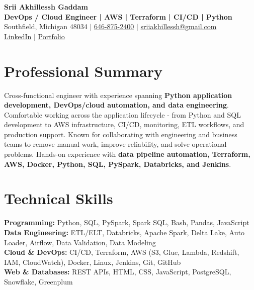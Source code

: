 \documentclass[letterpaper,10pt]{article}
\begin{document}
\fontsize{9.35pt}{10.45pt}\selectfont

\begin{center}
    {\LARGE \textbf{Srii Akhillessh Gaddam}} \\[-1pt]
    \textbf{DevOps / Cloud Engineer | AWS | Terraform | CI/CD | Python} \\[2pt]
    Southfield, Michigan 48034 $|$
    \href{tel:6468752400}{646-875-2400} $|$
    \href{mailto:sriiakhillessh@gmail.com}{sriiakhillessh@gmail.com} \\[1pt]
    \href{https://www.linkedin.com/in/srii-akhiilessh-gaddam-b48668191/}{LinkedIn} $|$
    \href{https://sriiakhillesshg.github.io/portfolio/}{Portfolio}
\end{center}
\vspace{-8pt}

\section{Professional Summary}
\small{Cross-functional engineer with experience spanning \textbf{Python application development, DevOps/cloud automation, and data engineering}. Comfortable working across the application lifecycle - from Python and SQL development to AWS infrastructure, CI/CD, monitoring, ETL workflows, and production support. Known for collaborating with engineering and business teams to remove manual work, improve reliability, and solve operational problems. Hands-on experience with \textbf{data pipeline automation, Terraform, AWS, Docker, Python, SQL, PySpark, Databricks, and Jenkins}.}

\section{Technical Skills}
\small{
\textbf{Programming:} Python, SQL, PySpark, Spark SQL, Bash, Pandas, JavaScript \\
\textbf{Data Engineering:} ETL/ELT, Databricks, Apache Spark, Delta Lake, Auto Loader, Airflow, Data Validation, Data Modeling \\
\textbf{Cloud \& DevOps:} CI/CD, Terraform, AWS (S3, Glue, Lambda, Redshift, IAM, CloudWatch), Docker, Linux, Jenkins, Git, GitHub \\
\textbf{Web \& Databases:} REST APIs, HTML, CSS, JavaScript, PostgreSQL, Snowflake, Greenplum
}
\end{document}
